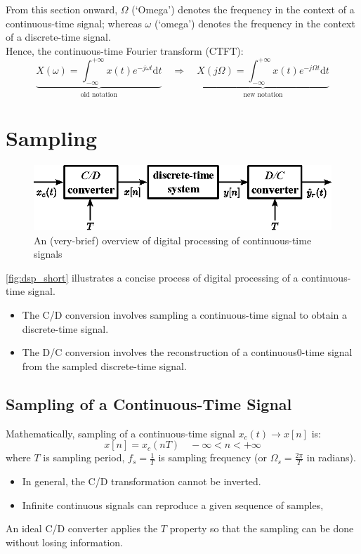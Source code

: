 \begin{mdframed}[frametitle={Change in notation}, nobreak=false]
    From this section onward, $\Omega$ (`Omega') denotes the frequency in the context of a continuous-time signal; whereas $\omega$ (`omega') denotes the frequency in the context of a discrete-time signal. \\

    Hence, the continuous-time Fourier transform (CTFT):
    \[
        \underbrace{X(\omega) = \int_{-\infty}^{+\infty} x(t) e^{-j\omega t} \mathrm{d}t}_{\text{old notation}}
        \quad \Rightarrow \quad 
        \underbrace{X(j\Omega) = \int_{-\infty}^{+\infty} x(t) e^{-j\Omega t} \mathrm{d}t}_{\text{new notation}}
    \]
\end{mdframed}


\section{Sampling}
\begin{figure}[H]
    \centering
    \includegraphics[width=.65\textwidth]{images/digital-processing-of-continuous-signals-short.eps}
    \caption{An (very-brief) overview of  digital processing of continuous-time signals}
    \label{fig:dsp_short}
\end{figure}
\autoref{fig:dsp_short} illustrates a concise process of digital processing of a continuous-time signal. 
\begin{itemize}
    \item The C/D conversion involves sampling a continuous-time signal to obtain a discrete-time signal.

    \item The D/C conversion involves the reconstruction of a continuous0-time signal from the sampled discrete-time signal.
\end{itemize} 

\subsection{Sampling of a Continuous-Time Signal}
Mathematically, sampling of a continuous-time signal $x_{c}(t) \to x[n]$ is:
\[ x[n] = x_{c}(nT) \quad -\infty < n < +\infty \]
where $T$ is sampling period, $f_{s} = \frac{1}{T}$ is sampling frequency (or $\Omega_{s}=\frac{2\pi}{T}$ in radians). 
\begin{itemize}
    \item In general, the C/D transformation cannot be inverted.
    \item Infinite continuous signals can reproduce a given sequence of samples,
\end{itemize}
An ideal C/D converter applies the $T$ property so that the sampling can be done without losing information. \\


